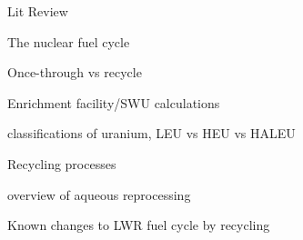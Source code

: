 \documentclass{report}
\begin{document}
\begin{outline}
\item Lit Review
\begin{outline}
    \item The nuclear fuel cycle
    \begin{outline}
          \item Once-through vs recycle \cite{tsoulfanidis_nuclear_2013}
          \item Enrichment facility/SWU calculations \cite{tsoulfanidis_nuclear_2013}
          \begin{outline}
              \item classifications of uranium, LEU vs HEU vs HALEU
          \end{outline}
          \item Recycling processes \cite{tsoulfanidis_nuclear_2013}
          \begin{outline}
              \item overview of aqueous reprocessing 
              \item Known changes to LWR fuel cycle by recycling 
              \item 
          \end{outline}
    \end{outline}
    

\end{outline}
\end{outline}
\end{document}
